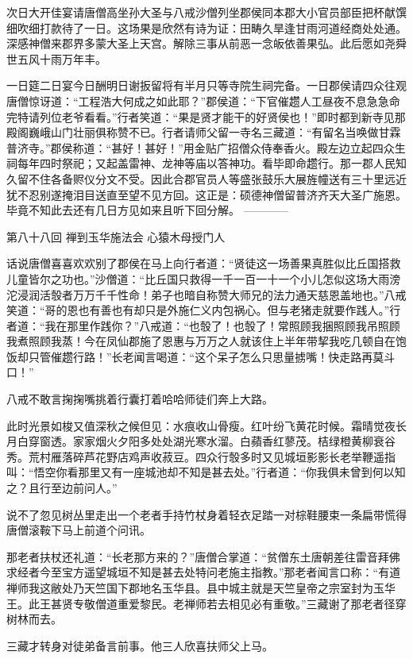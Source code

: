 \documentclass[12pt,UTF8]{ctexbook}
\begin{document}
{	次日大开佳宴请唐僧高坐孙大圣与八戒沙僧列坐郡侯同本郡大小官员部臣把杯献馔细吹细打款待了一日。这场果是欣然有诗为证：田畴久旱逢甘雨河道经商处处通。深感神僧来郡界多蒙大圣上天宫。解除三事从前恶一念皈依善果弘。此后愿如尧舜世五风十雨万年丰。
	
	一日筵二日宴今日酬明日谢扳留将有半月只等寺院生祠完备。一日郡侯请四众往观唐僧惊讶道：“工程浩大何成之如此耶？”郡侯道：“下官催趱人工昼夜不息急急命完特请列位老爷看看。”行者笑道：“果是贤才能干的好贤侯也！”即时都到新寺见那殿阁巍峨山门壮丽俱称赞不已。行者请师父留一寺名三藏道：“有留名当唤做甘霖普济寺。”郡侯称道：“甚好！甚好！”用金贴广招僧众侍奉香火。殿左边立起四众生祠每年四时祭祀；又起盖雷神、龙神等庙以答神功。看毕即命趱行。那一郡人民知久留不住各备赆仪分文不受。因此合郡官员人等盛张鼓乐大展旌幢送有三十里远近犹不忍别遂掩泪目送直至望不见方回。这正是：硕德神僧留普济齐天大圣广施恩。毕竟不知此去还有几日方见如来且听下回分解。
	------------
	
	第八十八回 禅到玉华施法会 心猿木母授门人
	
	话说唐僧喜喜欢欢别了郡侯在马上向行者道：“贤徒这一场善果真胜似比丘国搭救儿童皆尔之功也。”沙僧道：“比丘国只救得一千一百一十一个小儿怎似这场大雨滂沱浸润活彀者万万千千性命！弟子也暗自称赞大师兄的法力通天慈恩盖地也。”八戒笑道：“哥的恩也有善也有却只是外施仁义内包祸心。但与老猪走就要作践人。”行者道：“我在那里作践你？”八戒道：“也彀了！也彀了！常照顾我捆照顾我吊照顾我煮照顾我蒸！今在凤仙郡施了恩惠与万万之人就该住上半年带挈我吃几顿自在饱饭却只管催趱行路！”长老闻言喝道：“这个呆子怎么只思量掳嘴！快走路再莫斗口！”
	
	八戒不敢言掬掬嘴挑着行囊打着哈哈师徒们奔上大路。
	
	此时光景如梭又值深秋之候但见：水痕收山骨瘦。红叶纷飞黄花时候。霜晴觉夜长月白穿窗透。家家烟火夕阳多处处湖光寒水溜。白蘋香红蓼茂。桔绿橙黄柳衰谷秀。荒村雁落碎芦花野店鸡声收菽豆。四众行彀多时又见城垣影影长老举鞭遥指叫：“悟空你看那里又有一座城池却不知是甚去处。”行者道：“你我俱未曾到何以知之？且行至边前问人。”
	
	说不了忽见树丛里走出一个老者手持竹杖身着轻衣足踏一对棕鞋腰束一条扁带慌得唐僧滚鞍下马上前道个问讯。
	
	那老者扶杖还礼道：“长老那方来的？”唐僧合掌道：“贫僧东土唐朝差往雷音拜佛求经者今至宝方遥望城垣不知是甚去处特问老施主指教。”那老者闻言口称：“有道禅师我这敝处乃天竺国下郡地名玉华县。县中城主就是天竺皇帝之宗室封为玉华王。此王甚贤专敬僧道重爱黎民。老禅师若去相见必有重敬。”三藏谢了那老者径穿树林而去。
	
	三藏才转身对徒弟备言前事。他三人欣喜扶师父上马。
	
}
\end{document}
